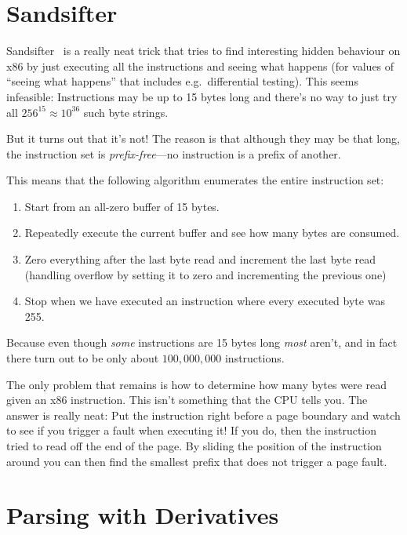 \documentclass[a4paper]{book}
\begin{document}
\section{Sandsifter}

Sandsifter~\cite{sandsifter} is a really neat trick that tries to find interesting hidden behaviour on x86 by just executing all the instructions and seeing what happens
(for values of ``seeing what happens'' that includes e.g.\ differential testing).
This seems infeasible:
Instructions may be up to 15 bytes long and there's no way to just try all \(256^{15} \approx 10^{36}\) such byte strings.

But it turns out that it's not!
The reason is that although they may be that long,
the instruction set is \emph{prefix-free}---no
instruction is a prefix of another.

This means that the following algorithm enumerates the entire instruction set:

\begin{enumerate}
\item Start from an all-zero buffer of 15 bytes.
\item Repeatedly execute the current buffer and see how many bytes are consumed.
\item Zero everything after the last byte read and increment the last byte read (handling overflow by setting it to zero and incrementing the previous one)
\item Stop when we have executed an instruction where every executed byte was 255.
\end{enumerate}

Because even though \emph{some} instructions are 15 bytes long \emph{most} aren't,
and in fact there turn out to be only about \(100,000,000\) instructions.

The only problem that remains is how to determine how many bytes were read given an x86 instruction.
This isn't something that the CPU tells you.
The answer is really neat:
Put the instruction right before a page boundary and watch to see if you trigger a fault when executing it!
If you do, then the instruction tried to read off the end of the page.
By sliding the position of the instruction around you can then find the smallest prefix that does not trigger a page fault.

\section{Parsing with Derivatives}
\end{document}
